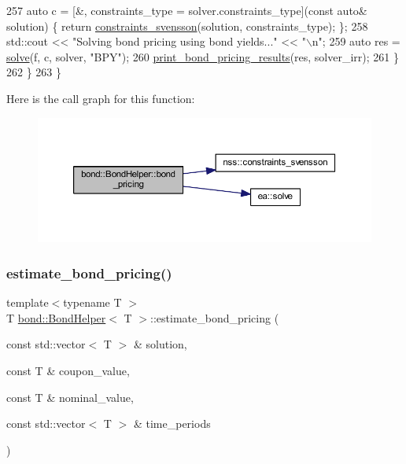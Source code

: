 \begin{DoxyCode}
257             \textcolor{keyword}{auto} c = [&, constraints\_type = solver.constraints\_type](\textcolor{keyword}{const} \textcolor{keyword}{auto}& solution) \{ \textcolor{keywordflow}{return} 
      \hyperlink{namespacenss_a39de3569a71e773f9da82c713eb7e6eb}{constraints\_svensson}(solution, constraints\_type); \};
258             std::cout << \textcolor{stringliteral}{"Solving bond pricing using bond yields..."} << \textcolor{stringliteral}{"\(\backslash\)n"};
259             \textcolor{keyword}{auto} res = \hyperlink{namespaceea_a6450b5bf61e9fdca8b6c19267e14c560}{solve}(f, c, solver, \textcolor{stringliteral}{"BPY"});
260             \hyperlink{classbond_1_1_bond_helper_a28159ce3ba6b11611d6368fd5a601f45}{print\_bond\_pricing\_results}(res, solver\_irr);
261         \}
262         \}
263     \}
\end{DoxyCode}
Here is the call graph for this function\+:
\nopagebreak
\begin{figure}[H]
\begin{center}
\leavevmode
\includegraphics[width=350pt]{classbond_1_1_bond_helper_a160a6bba890e45968d11d887ff34e294_cgraph}
\end{center}
\end{figure}
\mbox{\label{classbond_1_1_bond_helper_a1288528021e7c60e3a1435d39ad8611d}} 
\subsubsection{\texorpdfstring{estimate\+\_\+bond\+\_\+pricing()}{estimate\_bond\_pricing()}}
{\footnotesize\ttfamily template$<$typename T $>$ \\
T \hyperlink{classbond_1_1_bond_helper}{bond\+::\+Bond\+Helper}$<$ T $>$\+::estimate\+\_\+bond\+\_\+pricing (\begin{DoxyParamCaption}\item[{const std\+::vector$<$ T $>$ \&}]{solution,  }\item[{const T \&}]{coupon\+\_\+value,  }\item[{const T \&}]{nominal\+\_\+value,  }\item[{const std\+::vector$<$ T $>$ \&}]{time\+\_\+periods }\end{DoxyParamCaption})\hspace{0.3cm}{\ttfamily [private]}}



